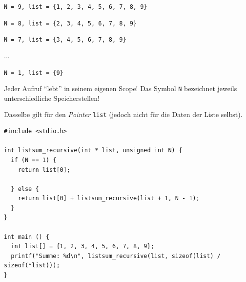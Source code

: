 \begin{frame}
%
\scriptsize
\begin{codebox}[Rekursionsstufe 0: Symbol und Werte, equal height group=grRecIn]
\texttt{N = 9, list = \{1, 2, 3, 4, 5, 6, 7, 8, 9\}}
\begin{codebox}
\texttt{N = 8, list = \{2, 3, 4, 5, 6, 7, 8, 9\}}
\begin{codebox}
\texttt{N = 7, list = \{3, 4, 5, 6, 7, 8, 9\}}
\begin{codebox}[Rekursionsstufe 3-7]
...
\begin{codebox}[Rekursionsstufe 8]
\texttt{N = 1, list = \{9\}}%
\end{codebox}%
\end{codebox}%
\end{codebox}%
\end{codebox}%
\end{codebox}
%
\small
\begin{hintbox}[Beachte, equal height group=grRecIn]
Jeder Aufruf \enquote{lebt} in seinem eigenen Scope! Das Symbol \texttt{N} bezeichnet jeweils unterschiedliche Speicherstellen!

Dasselbe gilt für den \emph{Pointer} \texttt{list} (jedoch nicht für die Daten der Liste selbst).
\end{hintbox}
%
\end{frame}


\begin{frame}[fragile]
%
\begin{codebox}
\begin{verbatim}
#include <stdio.h>

int listsum_recursive(int * list, unsigned int N) {
  if (N == 1) {
    return list[0];
    
  } else {
    return list[0] + listsum_recursive(list + 1, N - 1);
  }
}

int main () {
  int list[] = {1, 2, 3, 4, 5, 6, 7, 8, 9};
  printf("Summe: %d\n", listsum_recursive(list, sizeof(list) / sizeof(*list)));
}

\end{verbatim}
\end{codebox}
%
\end{frame}

